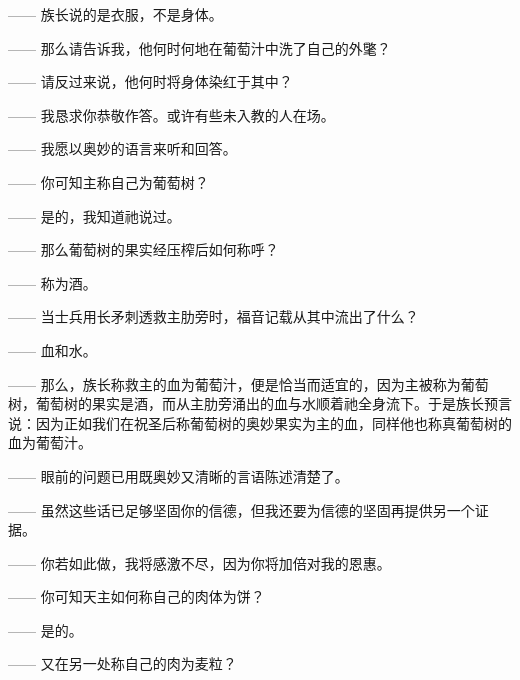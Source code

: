 —— 族长说的是衣服，不是身体。\par

—— 那么请告诉我，他何时何地在葡萄汁中洗了自己的外氅？\par

—— 请反过来说，他何时将身体染红于其中？\par

—— 我恳求你恭敬作答。或许有些未入教的人在场。\par

—— 我愿以奥妙的语言来听和回答。\par

—— 你可知主称自己为葡萄树？\par

—— 是的，我知道祂说过。\par

—— 那么葡萄树的果实经压榨后如何称呼？\par

—— 称为酒。\par

—— 当士兵用长矛刺透救主肋旁时，福音记载从其中流出了什么？\par

—— 血和水。\par

—— 那么，族长称救主的血为葡萄汁，便是恰当而适宜的，因为主被称为葡萄树，葡萄树的果实是酒，而从主肋旁涌出的血与水顺着祂全身流下。于是族长预言说：因为正如我们在祝圣后称葡萄树的奥妙果实为主的血，同样他也称真葡萄树的血为葡萄汁。\par

—— 眼前的问题已用既奥妙又清晰的言语陈述清楚了。\par

—— 虽然这些话已足够坚固你的信德，但我还要为信德的坚固再提供另一个证据。\par

—— 你若如此做，我将感激不尽，因为你将加倍对我的恩惠。\par

—— 你可知天主如何称自己的肉体为饼？\par

—— 是的。\par

—— 又在另一处称自己的肉为麦粒？\par

